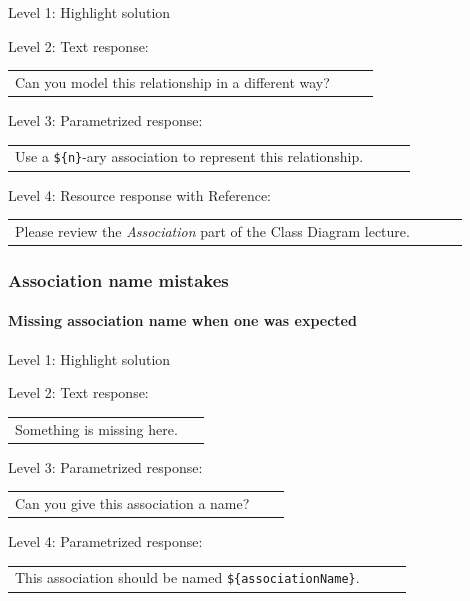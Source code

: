 \noindent Level 1: Highlight solution \medskip

\noindent Level 2: Text response: \medskip

\begin{tabular}{|p{0.9\linewidth}}
Can you model this relationship in a different way?
\end{tabular} \medskip

\noindent Level 3: Parametrized response: \medskip

\begin{tabular}{|p{0.9\linewidth}}
Use a \verb|${n}|-ary association to represent this relationship.
\end{tabular} \medskip

\noindent Level 4: Resource response with Reference: \medskip

\begin{tabular}{|p{0.9\linewidth}}
Please review the \textit{Association} part of the Class Diagram lecture.
\end{tabular} \medskip


\subsubsection{Association name mistakes}

\paragraph{Missing association name when one was expected}

\noindent Level 1: Highlight solution \medskip

\noindent Level 2: Text response: \medskip

\begin{tabular}{|p{0.9\linewidth}}
Something is missing here.
\end{tabular} \medskip

\noindent Level 3: Parametrized response: \medskip

\begin{tabular}{|p{0.9\linewidth}}
Can you give this association a name?
\end{tabular} \medskip

\noindent Level 4: Parametrized response: \medskip

\begin{tabular}{|p{0.9\linewidth}}
This association should be named \verb|${associationName}|.
\end{tabular} \medskip

